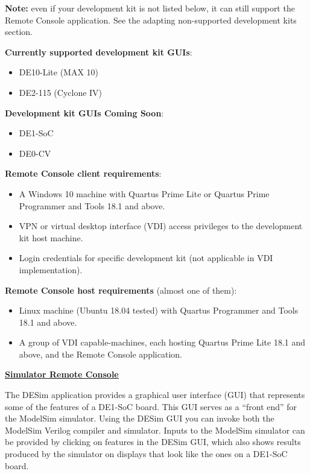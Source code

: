 \documentclass[a4paper]{article}
\newcommand{\dquotes}[1]{``#1''}
\begin{document}
    \noindent
    \textbf{Note:} even if your development kit is not listed below, it can still support the Remote Console application. See the adapting non-supported development kits section.\newline

    \noindent
    \textbf{Currently supported development kit GUIs}:
    \begin{itemize}
        \item DE10-Lite (MAX 10)
        \item DE2-115 (Cyclone IV)
    \end{itemize}
    \textbf{Development kit GUIs Coming Soon}:
    \begin{itemize}
        \item DE1-SoC
        \item DE0-CV
    \end{itemize}
    \textbf{Remote Console client requirements}:
    \begin{itemize}
        \item A Windows 10 machine with Quartus Prime Lite or Quartus Prime Programmer and Tools 18.1 and above.
        \item VPN or virtual desktop interface (VDI) access privileges to the development kit host machine.
        \item Login credentials for specific development kit (not applicable in VDI implementation).
    \end{itemize}
    \textbf{Remote Console host requirements} (almost one of them):
    \begin{itemize}
        \item Linux machine (Ubuntu 18.04 tested) with Quartus Programmer and Tools 18.1 and above.
        \item A group of VDI capable-machines, each hosting Quartus Prime Lite 18.1 and above, and the Remote Console application.
    \end{itemize}\newpage

    \begin{flushleft}
        \textbf{\underline{Simulator Remote Console}}
    \end{flushleft}
    The DESim application provides a graphical user interface (GUI) that represents some of the features of a DE1-SoC board. This GUI serves as a \dquotes{front end} for the ModelSim simulator. Using the DESim GUI you can invoke both the ModelSim Verilog compiler and simulator. Inputs to the ModelSim simulator can be provided by clicking on features in the DESim GUI, which also shows results produced by the simulator on displays that look like the ones on a DE1-SoC board.\newline
\end{document}
